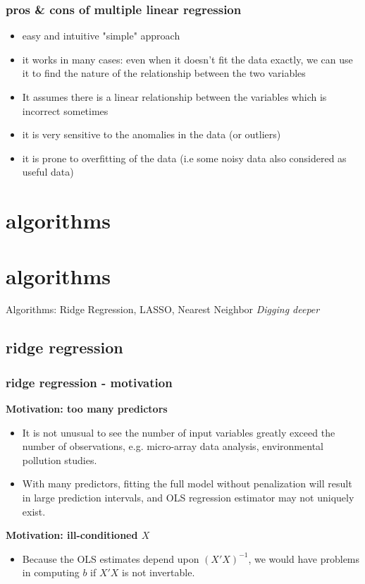 \documentclass{beamer}
\begin{document}
\begin{frame}
\frametitle{pros \& cons of multiple linear regression}
\begin{itemize}
\item easy and intuitive "simple" approach
\item it works in many cases: even when it doesn’t fit the data exactly, we can use it to find the nature of the relationship between the two variables
\item It assumes there is a linear relationship between the variables which is incorrect sometimes
\item it is very sensitive to the anomalies in the data (or outliers)
\item it is prone to overfitting of the data (i.e some noisy data also considered as useful data)
\end{itemize}

\end{frame}



\section{algorithms}
\section{algorithms}
\begin{frame}
\Huge{Algorithms:
\newline
Ridge Regression, LASSO, Nearest Neighbor}
\newline
\newline
\normalsize
\textit{ Digging deeper}
\end{frame}
\subsection{ridge regression}
\begin{frame}
\frametitle{ridge regression - motivation}
\textbf{Motivation: too many predictors}
\begin{itemize}
\item It is not unusual to see the number of input variables greatly exceed the number of observations, e.g. micro-array data analysis, environmental pollution studies.
\item With many predictors, fitting the full model without penalization will result in large prediction intervals, and OLS regression estimator may not uniquely exist.
\end{itemize}
\bigskip
\textbf{Motivation: ill-conditioned $X$}
\begin{itemize}
\item Because the OLS estimates depend upon $(X′X)^{-1}$, we would have problems in computing $b$ if $X′X$ is not invertable.
\end{itemize}
\end{frame}
\end{document}
